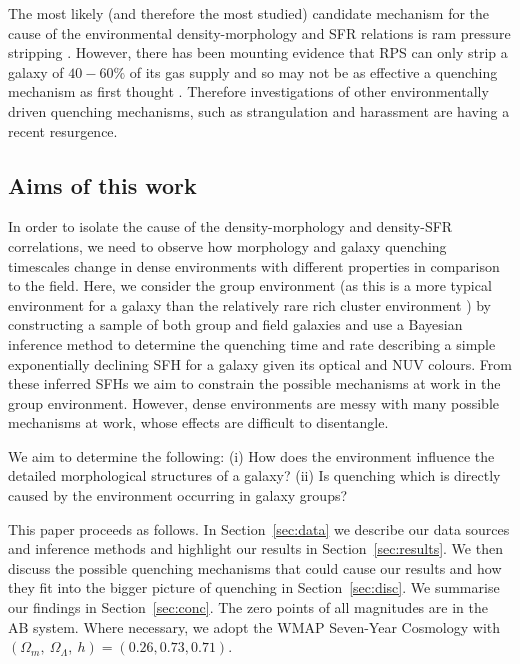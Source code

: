 \documentclass[useAMS,usenatbib]{mn2e}
\begin{document}
The most likely (and therefore the most studied) candidate mechanism for the cause of the environmental density-morphology and SFR relations is ram pressure stripping \citep[RPS;][]{abadi99, poggianti99}. However, there has been mounting evidence that RPS can only strip a galaxy of $40-60\%$ of its gas supply \citep{fillingham16} and so may not be as effective a quenching mechanism as first thought \citep{emerick16}. Therefore investigations of other environmentally driven quenching mechanisms, such as strangulation \citep{peng15, hahn16, maier16, paccagnella16, roberts16, vandevoort16} and harassment \citep[high speed galaxy `fly-by' gravitational interactions][]{bialas15, smith15b} are having a recent resurgence. 


\subsection{Aims of this work}\label{sec:aims} 
  
In order to isolate the cause of the density-morphology and density-SFR correlations, we need to observe how morphology and galaxy quenching timescales change in dense environments with different properties in comparison to the field. Here, we consider the group environment (as this is a more typical environment for a galaxy than the relatively rare rich cluster environment \citep{carlberg04}) by constructing a sample of both group and field galaxies and use a Bayesian inference method to determine the quenching time and rate describing a simple exponentially declining SFH for a galaxy given its optical and NUV colours. From these inferred SFHs we aim to constrain the possible mechanisms at work in the group environment. However, dense environments are messy with many possible mechanisms at work, whose effects are difficult to disentangle. 

We aim to determine the following: (i) How does the environment influence the detailed morphological structures of a galaxy?  (ii) Is quenching which is directly caused by the environment occurring in galaxy groups?
 
This paper proceeds as follows. In Section~\ref{sec:data} we describe our data sources and inference methods and highlight our results in Section~\ref{sec:results}. We then discuss the possible quenching mechanisms that could cause our results and how they fit into the bigger picture of quenching in Section~\ref{sec:disc}. We summarise our findings in Section~\ref{sec:conc}. The zero points of all magnitudes are in the AB system. Where necessary, we adopt the WMAP Seven-Year Cosmology \citep{jarosik11} with $(\Omega_m , ~\Omega_\Lambda , ~h) = (0.26, 0.73, 0.71)$.
\end{document}

